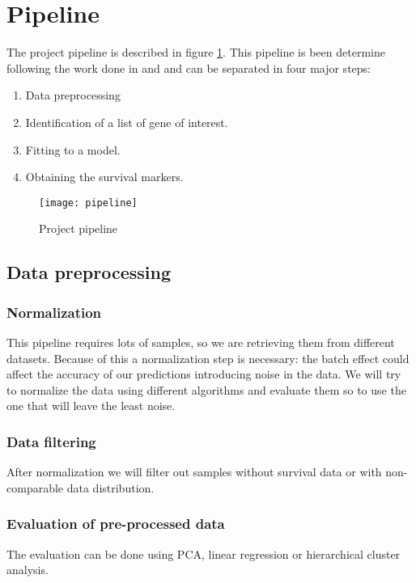 \documentclass[fleqn,10pt]{SelfArx} %
\begin{document}
\section{Pipeline}
The project pipeline is described in figure \ref{fig:pipeline}.
This pipeline is been determine following the work done in \cite{Martinez-Romero2018-gp} and \cite{Wang2020-mr} and can be separated in four major steps:

\begin{enumerate}
	\item Data preprocessing
	\item Identification of a list of gene of interest.
	\item Fitting to a model.
	\item Obtaining the survival markers.
\end{enumerate}

\begin{figure}[ht]\centering %
	\texttt{[image: pipeline]}
	\caption{Project pipeline}
	\label{fig:pipeline}
\end{figure}

	\subsection{Data preprocessing}

		\subsubsection{Normalization}
		This pipeline requires lots of samples, so we are retrieving them from different datasets.
		Because of this a normalization step is necessary: the batch effect could affect the accuracy of our predictions introducing noise in the data.
		We will try to normalize the data using different algorithms and evaluate them so to use the one that will leave the least noise.

		\subsubsection{Data filtering}
		After normalization we will filter out samples without survival data or with non-comparable data distribution.

		\subsubsection{Evaluation of pre-processed data}
		The evaluation can be done using PCA, linear regression or hierarchical cluster analysis.
\end{document}
